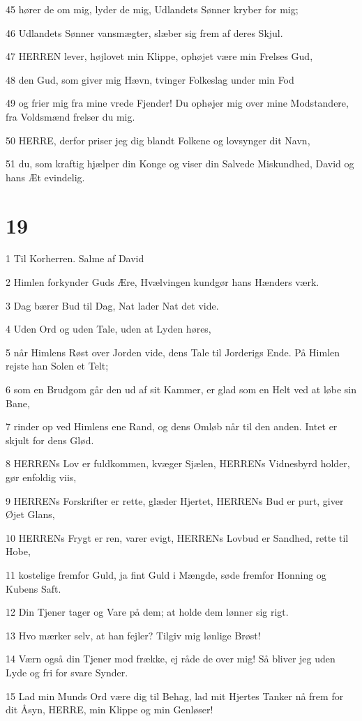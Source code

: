 \par 45 hører de om mig, lyder de mig, Udlandets Sønner kryber for mig;
\par 46 Udlandets Sønner vansmægter, slæber sig frem af deres Skjul.
\par 47 HERREN lever, højlovet min Klippe, ophøjet være min Frelses Gud,
\par 48 den Gud, som giver mig Hævn, tvinger Folkeslag under min Fod
\par 49 og frier mig fra mine vrede Fjender! Du ophøjer mig over mine Modstandere, fra Voldsmænd frelser du mig.
\par 50 HERRE, derfor priser jeg dig blandt Folkene og lovsynger dit Navn,
\par 51 du, som kraftig hjælper din Konge og viser din Salvede Miskundhed, David og hans Æt evindelig.

\chapter{19}

\par 1 Til Korherren. Salme af David
\par 2 Himlen forkynder Guds Ære, Hvælvingen kundgør hans Hænders værk.
\par 3 Dag bærer Bud til Dag, Nat lader Nat det vide.
\par 4 Uden Ord og uden Tale, uden at Lyden høres,
\par 5 når Himlens Røst over Jorden vide, dens Tale til Jorderigs Ende. På Himlen rejste han Solen et Telt;
\par 6 som en Brudgom går den ud af sit Kammer, er glad som en Helt ved at løbe sin Bane,
\par 7 rinder op ved Himlens ene Rand, og dens Omløb når til den anden. Intet er skjult for dens Glød.
\par 8 HERRENs Lov er fuldkommen, kvæger Sjælen, HERRENs Vidnesbyrd holder, gør enfoldig viis,
\par 9 HERRENs Forskrifter er rette, glæder Hjertet, HERRENs Bud er purt, giver Øjet Glans,
\par 10 HERRENs Frygt er ren, varer evigt, HERRENs Lovbud er Sandhed, rette til Hobe,
\par 11 kostelige fremfor Guld, ja fint Guld i Mængde, søde fremfor Honning og Kubens Saft.
\par 12 Din Tjener tager og Vare på dem; at holde dem lønner sig rigt.
\par 13 Hvo mærker selv, at han fejler? Tilgiv mig lønlige Brøst!
\par 14 Værn også din Tjener mod frække, ej råde de over mig! Så bliver jeg uden Lyde og fri for svare Synder.
\par 15 Lad min Munds Ord være dig til Behag, lad mit Hjertes Tanker nå frem for dit Åsyn, HERRE, min Klippe og min Genløser!

